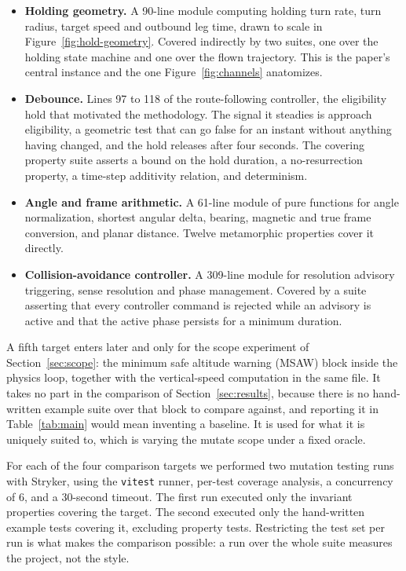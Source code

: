 \documentclass[12pt]{article}
\begin{document}
\begin{itemize}
\item \textbf{Holding geometry.} A 90-line module computing holding turn rate,
      turn radius, target speed and outbound leg time, drawn to scale in
      Figure~\ref{fig:hold-geometry}. Covered indirectly by two suites, one over
      the holding state machine and one over the flown trajectory. This is the
      paper's central instance and the one Figure~\ref{fig:channels} anatomizes.
\item \textbf{Debounce.} Lines 97 to 118 of the route-following controller, the
      eligibility hold that motivated the methodology. The signal it steadies is
      approach eligibility, a geometric test that can go false for an instant
      without anything having changed, and the hold releases after four seconds. The covering property
      suite asserts a bound on the hold duration, a no-resurrection property, a
      time-step additivity relation, and determinism.
\item \textbf{Angle and frame arithmetic.} A 61-line module of pure functions for
      angle normalization, shortest angular delta, bearing, magnetic and true
      frame conversion, and planar distance. Twelve metamorphic properties cover
      it directly.
\item \textbf{Collision-avoidance controller.} A 309-line module for resolution
      advisory triggering, sense resolution and phase management. Covered by a
      suite asserting that every controller command is rejected while an advisory
      is active and that the active phase persists for a minimum duration.
\end{itemize}

A fifth target enters later and only for the scope experiment of
Section~\ref{sec:scope}: the minimum safe altitude warning (MSAW) block inside the physics loop,
together with the vertical-speed computation in the same file. It takes no part in
the comparison of Section~\ref{sec:results}, because there is no hand-written
example suite over that block to compare against, and reporting it in
Table~\ref{tab:main} would mean inventing a baseline. It is used for what it is
uniquely suited to, which is varying the mutate scope under a fixed oracle.

For each of the four comparison targets we performed two mutation testing runs with Stryker, using the
\texttt{vitest} runner, per-test coverage analysis, a concurrency of 6, and a
30-second timeout. The first run executed only the invariant properties covering
the target. The second executed only the hand-written example tests covering it,
excluding property tests. Restricting the test set per run is what makes the
comparison possible: a run over the whole suite measures the project, not the
style.
\end{document}
